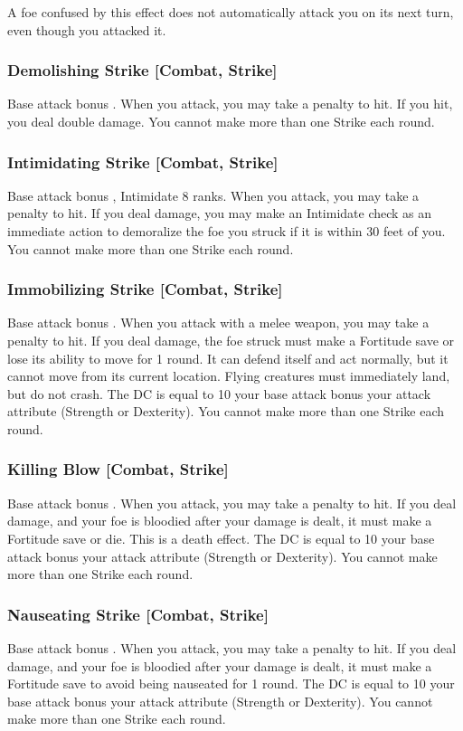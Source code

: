 \confusionexplanation A foe confused by this effect does not automatically attack you on its next turn, even though you attacked it.

\subsubsection{Demolishing Strike [Combat, Strike]}
\featpre Base attack bonus .
\featben When you attack, you may take a  penalty to hit. If you hit, you deal double damage. You cannot make more than one Strike each round.

\subsubsection{Intimidating Strike [Combat, Strike]}
\featpres Base attack bonus , Intimidate 8 ranks.
\featben When you attack, you may take a  penalty to hit. If you deal damage, you may make an Intimidate check as an immediate action to demoralize the foe you struck if it is within 30 feet of you. You cannot make more than one Strike each round.

\subsubsection{Immobilizing Strike [Combat, Strike]}
\featpre Base attack bonus .
\featben When you attack with a melee weapon, you may take a  penalty to hit. If you deal damage, the foe struck must make a Fortitude save or lose its ability to move for 1 round. It can defend itself and act normally, but it cannot move from its current location. Flying creatures must immediately land, but do not crash. The DC is equal to 10 \add your base attack bonus \add your attack attribute (Strength or Dexterity). You cannot make more than one Strike each round.

\subsubsection{Killing Blow [Combat, Strike]}
\featpre Base attack bonus .
\featben When you attack, you may take a  penalty to hit. If you deal damage, and your foe is bloodied after your damage is dealt, it must make a Fortitude save or die. This is a death effect. The DC is equal to 10 \add your base attack bonus \add your attack attribute (Strength or Dexterity). You cannot make more than one Strike each round.

\subsubsection{Nauseating Strike [Combat, Strike]}
\featpre Base attack bonus .
\featben When you attack, you may take a  penalty to hit. If you deal damage, and your foe is bloodied after your damage is dealt, it must make a Fortitude save to avoid being nauseated for 1 round. The DC is equal to 10 \add your base attack bonus \add your attack attribute (Strength or Dexterity). You cannot make more than one Strike each round.

